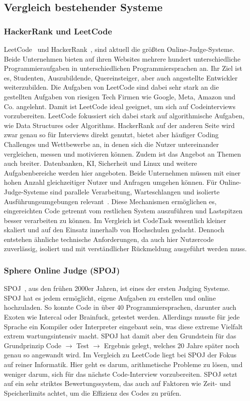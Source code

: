 \subsection{Vergleich bestehender Systeme}
	\subsubsection{HackerRank und LeetCode}
	LeetCode~\cite{leetcode} und HackerRank~\cite{hackerrank}, sind aktuell die größten Online-Judge-Systeme.
	Beide Unternehmen bieten auf ihren Websites mehrere hundert unterschiedliche Programmieraufgaben in unterschiedlichen Programmiersprachen an. Ihr Ziel ist es, Studenten, Auszubildende, Quereinsteiger, aber auch angestellte Entwickler weiterzubilden. Die Aufgaben von LeetCode sind dabei sehr stark an die gestellten Aufgaben von riesigen Tech Firmen wie Google, Meta, Amazon und Co. angelehnt. Damit ist LeetCode ideal geeignet, um sich auf Codeinterviews vorzubereiten. LeetCode fokussiert sich dabei stark auf algorithmische Aufgaben, wie Data Structures oder Algorithms. HackerRank auf der anderen Seite wird zwar genau so für Interviews direkt genutzt, bietet aber häufiger Coding Challenges und Wettbewerbe an, in denen sich die Nutzer untereinander vergleichen, messen und motivieren können. Zudem ist das Angebot an Themen auch breiter. Datenbanken, KI, Sicherheit und Linux und weitere Aufgabenbereiche werden hier angeboten.
	Beide Unternehmen müssen mit einer hohen Anzahl gleichzeitiger Nutzer und Anfragen umgehen können. Für Online-Judge-Systeme sind parallele Verarbeitung, Warteschlangen und isolierte Ausführungsumgebungen relevant~\cite{wasik2017onlinejudge}. Diese Mechanismen ermöglichen es, eingereichten Code getrennt vom restlichen System auszuführen und Lastspitzen besser verarbeiten zu können. Im Vergleich ist CodeTask wesentlich kleiner skaliert und auf den Einsatz innerhalb von Hochschulen gedacht. Dennoch entstehen ähnliche technische Anforderungen, da auch hier Nutzercode zuverlässig, isoliert und mit verständlicher Rückmeldung ausgeführt werden muss.
	
	\subsubsection{Sphere Online Judge (SPOJ)}
	SPOJ~\cite{spoj}, aus den frühen 2000er Jahren, ist eines der ersten Judging Systeme. SPOJ hat es jedem ermöglicht, eigene Aufgaben zu erstellen und online hochzuladen. So konnte Code in über 40 Programmiersprachen, darunter auch Exoten wie Intercal oder Brainfuck, getestet werden. Allerdings musste für jede Sprache ein Kompiler oder Interpreter eingebaut sein, was diese extreme Vielfalt extrem wartungsintensiv macht. SPOJ hat damit aber den Grundstein für das Grundprinzip Code $\rightarrow$ Test $\rightarrow$ Ergebnis gelegt, welches 20 Jahre später noch genau so angewandt wird. Im Vergleich zu LeetCode liegt bei SPOJ der Fokus auf reiner Informatik. Hier geht es darum, arithmetische Probleme zu lösen, und weniger darum, sich für das nächste Code-Interview vorzubereiten. SPOJ setzt auf ein sehr striktes Bewertungssystem, das auch auf Faktoren wie Zeit- und Speicherlimits achtet, um die Effizienz des Codes zu prüfen.
	
